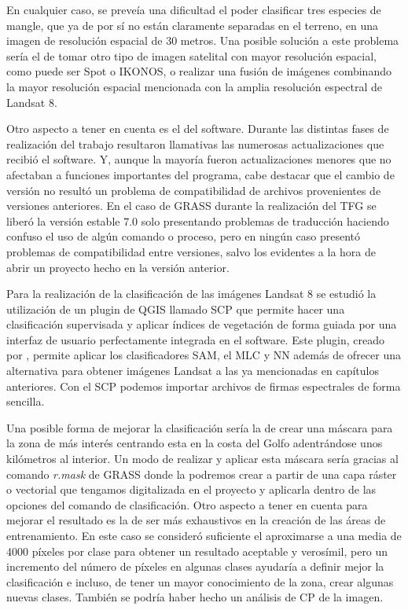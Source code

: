 En cualquier caso, se preveía una dificultad el poder clasificar tres especies de mangle, que ya de por sí no están claramente separadas en el terreno, en una imagen de resolución espacial de 30 metros. Una posible solución a este problema sería el de tomar otro tipo de imagen satelital con mayor resolución espacial, como puede ser Spot o IKONOS, o realizar una fusión de imágenes combinando la mayor resolución espacial mencionada con la amplia resolución espectral de Landsat 8.%

Otro aspecto a tener en cuenta es el del software. Durante las distintas fases de realización del trabajo resultaron llamativas las numerosas actualizaciones que recibió el software. Y, aunque la mayoría fueron actualizaciones menores que no afectaban a funciones importantes del programa, cabe destacar que el cambio de versión no resultó un problema de compatibilidad de archivos provenientes de versiones anteriores. En el caso de GRASS durante la realización del \ac{TFG} se liberó la versión estable 7.0 solo presentando problemas de traducción haciendo confuso el uso de algún comando o proceso, pero en ningún caso presentó problemas de compatibilidad entre versiones, salvo los evidentes a la hora de abrir un proyecto hecho en la versión anterior.%

Para la realización de la clasificación de las imágenes Landsat 8 se estudió la utilización de un plugin de QGIS llamado \ac{SCP} que permite hacer una clasificación supervisada y aplicar índices de vegetación de forma guiada por una interfaz de usuario perfectamente integrada en el software. Este plugin, creado por \cite{Congedo2015}, permite aplicar los clasificadores \ac{SAM}, el \ac{MLC} y \ac{NN} además de ofrecer una alternativa para obtener imágenes Landsat a las ya mencionadas en capítulos anteriores. Con el \ac{SCP} podemos importar archivos de firmas espectrales de forma sencilla.%

Una posible forma de mejorar la clasificación sería la de crear una máscara para la zona de más interés centrando esta en la costa del Golfo adentrándose unos kilómetros al interior. Un modo de realizar y aplicar esta máscara sería gracias al comando \textit{r.mask} de GRASS donde la podremos crear a partir de una capa ráster o vectorial que tengamos digitalizada en el proyecto y aplicarla dentro de las opciones del comando de clasificación. Otro aspecto a tener en cuenta para mejorar el resultado es la de ser más exhaustivos en la creación de las áreas de entrenamiento. En este caso se consideró suficiente el aproximarse a una media de 4000 píxeles por clase para obtener un resultado aceptable y verosímil, pero un incremento del número de píxeles en algunas clases ayudaría a definir mejor la clasificación e incluso, de tener un mayor conocimiento de la zona, crear algunas nuevas clases. También se podría haber hecho un análisis de \ac{CP} de la imagen.%

